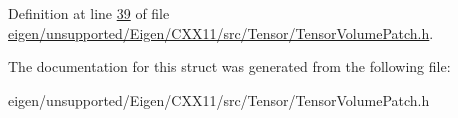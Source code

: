 Definition at line \hyperlink{eigen_2unsupported_2_eigen_2_c_x_x11_2src_2_tensor_2_tensor_volume_patch_8h_source_l00039}{39} of file \hyperlink{eigen_2unsupported_2_eigen_2_c_x_x11_2src_2_tensor_2_tensor_volume_patch_8h_source}{eigen/unsupported/\+Eigen/\+C\+X\+X11/src/\+Tensor/\+Tensor\+Volume\+Patch.\+h}.



The documentation for this struct was generated from the following file\+:\begin{DoxyCompactItemize}
\item 
eigen/unsupported/\+Eigen/\+C\+X\+X11/src/\+Tensor/\+Tensor\+Volume\+Patch.\+h\end{DoxyCompactItemize}
